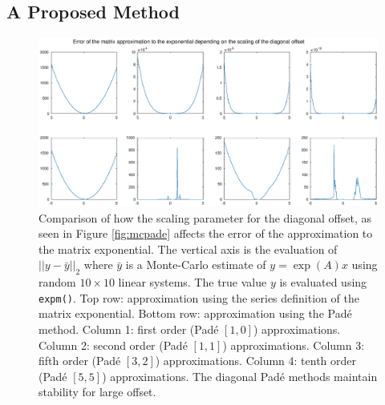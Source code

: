 \subsection{A Proposed Method}

\begin{figure}
    \centering
    \includegraphics[width=\linewidth]{Matlab/padevsserieserr.eps}
    \caption{
        Comparison of how the scaling parameter for the diagonal offset, as seen in Figure \ref{fig:mcpade} affects the error of the approximation to the matrix exponential.
        The vertical axis is the evaluation of $||y-\bar{y}||_2$ where $\bar{y}$ is a Monte-Carlo estimate of $y = \exp(A)x$ using random $10 \times 10$ linear systems.
        The true value $y$ is evaluated using \texttt{expm()}.
        Top row: approximation using the series definition of the matrix exponential.
        Bottom row: approximation using the Pad\'e method.
        Column 1: first order (Pad\'e $[1,0]$) approximations.
        Column 2: second order (Pad\'e $[1,1]$) approximations.
        Column 3: fifth order (Pad\'e $[3,2]$) approximations.
        Column 4: tenth order (Pad\'e $[5,5]$) approximations.
        The diagonal Pad\'e methods maintain stability for large offset.
    }
    \label{fig:padeserieserr}
\end{figure}

